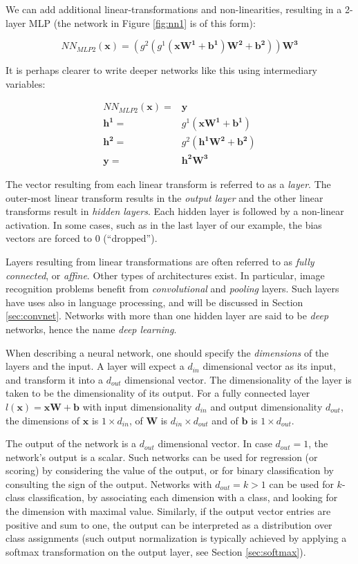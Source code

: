 \documentclass[jair,twoside,11pt,theapa]{article}
\newcommand{\m}[1]{\mathbf{#1}}%
\newcommand{\ygcomment}[1]{\textbf{[TODO: #1]}}
\renewcommand{\ygcomment}[1]{}
\begin{document}
{We can add additional linear-transformations and non-linearities, resulting in a
2-layer MLP (the network in Figure \ref{fig:nn1} is of this form):

\[ NN_{MLP2}(\m{x}) = (g^2(g^1(\m{x}\m{W^1} + \m{b^1})\m{W^2}+\m{b^2}))\m{W^3} \]

\noindent It is perhaps clearer to write deeper networks like this using intermediary
variables:

\begin{align*}
    NN_{MLP2}(\m{x}) =& \m{y}\\
    \m{h^1} =& g^1(\m{x}\m{W^1}+\m{b^1}) \\
    \m{h^2} =& g^2(\m{h^1}\m{W^2} + \m{b^2}) \\
    \m{y} =& \m{h^2} \m{W^3}
\end{align*}

The vector resulting from each linear transform is referred to as a \emph{layer}.
The outer-most linear transform results in the \emph{output layer} and the other
linear transforms result in \emph{hidden layers}. Each hidden layer is followed
by a non-linear activation.
In some cases, such as in the last layer of our example,
the bias vectors are forced to 0 (``dropped'').

\ygcomment{repeated sentence from start of section}
Layers resulting from linear transformations are often referred to as \emph{fully
connected}, or \emph{affine}.
Other types of architectures exist.
In particular, image
recognition problems benefit from \emph{convolutional} and \emph{pooling} layers. 
Such layers have uses also in language processing, and will be discussed in
Section \ref{sec:convnet}.  Networks with more than one hidden layer are said to
be \emph{deep} networks, hence the name \emph{deep learning}.

When describing a neural network, one should specify the \emph{dimensions} of
the layers and the input. A layer will expect a $d_{in}$ dimensional vector as
its input, and transform it into a $d_{out}$ dimensional vector. The
dimensionality of the layer is taken to be the dimensionality of its output.
For a fully connected layer $l(\m{x}) = \m{x}\m{W}+\m{b}$ with input
dimensionality $d_{in}$ and output dimensionality $d_{out}$, the dimensions of
$\m{x}$ is $1\times d_{in}$, of $\m{W}$ is $d_{in}\times d_{out}$ and of $\m{b}$
is $1\times d_{out}$.

The output of the network is a $d_{out}$ dimensional vector. In case $d_{out} =
1$, the network's output is a scalar. Such networks can be used for regression
(or scoring)
by considering the value of the output, or for binary
classification by consulting the sign of the output.  Networks with $d_{out} =
k > 1$ can be used for $k$-class classification, by associating each dimension
with a class, and looking for the dimension with maximal value.  Similarly, if
the output vector entries are positive and sum to one, the output can be
interpreted as a distribution over class assignments (such output 
normalization is typically achieved by applying a softmax transformation on
the output layer, see Section \ref{sec:softmax}).
\ygcomment{Added this paragraph per Miguel's comment, but is it needed here?
repetition..}

}
\end{document}
